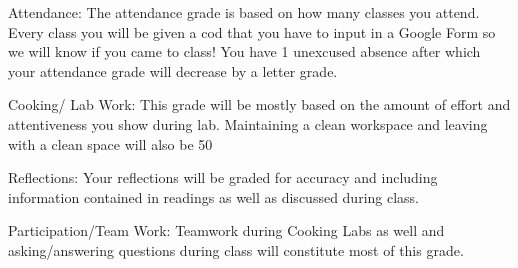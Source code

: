 \documentclass{article}
\begin{document}
Attendance: The attendance grade is based on how many classes you attend. Every class you will be given a cod that you have to input in a Google Form so we will know if you came to class! You have 1 unexcused absence after which  your attendance grade will decrease by a letter grade.

Cooking/ Lab Work: This grade will be mostly based on the amount of effort and attentiveness you show during lab. Maintaining a clean workspace and leaving with a clean space will also be 50%

Reflections: Your reflections will be graded for accuracy and including information contained in readings as well as discussed during class.

Participation/Team Work: Teamwork during Cooking Labs as well and asking/answering questions during class will constitute most of this grade.
\end{document}
